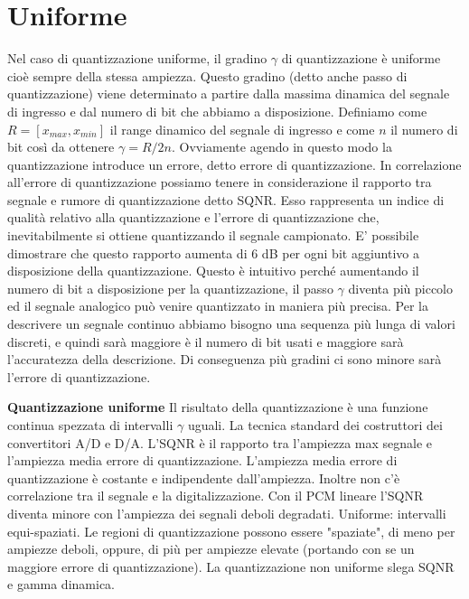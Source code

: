 \documentclass[a4paper,12pt]{article}
\begin{document}
\section{Uniforme}
Nel caso di quantizzazione uniforme, il gradino $\gamma$ di quantizzazione è uniforme cioè sempre della stessa ampiezza. Questo gradino (detto anche passo di quantizzazione) viene determinato a partire dalla massima dinamica del segnale di ingresso e dal numero di bit che abbiamo a disposizione. Definiamo come $R=[x_{max},x_{min}]$ il range dinamico del segnale di ingresso e come $n$ il numero di bit così da ottenere $\gamma=R/2n$. Ovviamente agendo in questo modo la quantizzazione introduce un errore, detto errore di quantizzazione. In correlazione all'errore di quantizzazione possiamo tenere in considerazione il rapporto tra segnale e rumore di quantizzazione detto SQNR. Esso rappresenta un indice di qualità relativo alla quantizzazione e l'errore di quantizzazione che, inevitabilmente si ottiene quantizzando il segnale campionato. E' possibile dimostrare che questo rapporto aumenta di 6 dB per ogni bit aggiuntivo a disposizione della quantizzazione. Questo è intuitivo perché aumentando il numero di bit a disposizione per la quantizzazione, il passo $\gamma$ diventa più piccolo ed il segnale analogico può venire quantizzato in maniera più precisa. Per la descrivere un segnale continuo abbiamo bisogno una sequenza più lunga di valori discreti, e quindi sarà maggiore è il numero di bit usati e maggiore sarà l'accuratezza della descrizione. Di conseguenza più gradini ci sono minore sarà l'errore di quantizzazione.

\textbf{Quantizzazione uniforme}
Il risultato della quantizzazione è una funzione continua spezzata di intervalli $\gamma$ uguali. La tecnica standard dei costruttori dei convertitori A/D e D/A. L'SQNR è il rapporto tra l'ampiezza max segnale e l'ampiezza media errore di quantizzazione. L'ampiezza media errore di quantizzazione è costante e indipendente dall’ampiezza. Inoltre non c'è correlazione tra il segnale e la digitalizzazione. Con il PCM lineare l'SQNR diventa minore con l’ampiezza dei segnali deboli degradati. Uniforme: intervalli equi-spaziati.
Le regioni di quantizzazione possono essere "spaziate", di meno per ampiezze deboli, oppure, di più per ampiezze elevate (portando con se un maggiore errore di quantizzazione). La quantizzazione non uniforme slega SQNR e gamma dinamica.
\end{document}
